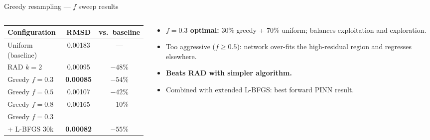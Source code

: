 \documentclass[aspectratio=169, 11pt]{beamer}
\begin{document}
\begin{frame}{Greedy resampling --- $f$ sweep results}
  \begin{columns}[T]
    \begin{column}{0.50\textwidth}
      \centering\footnotesize
      \begin{tabular}{@{}lcc@{}}
        \toprule
        \textbf{Configuration} & \textbf{RMSD} & \textbf{vs.\ baseline} \\
        \midrule
        Uniform (baseline)  & 0.00183 & --- \\
        RAD $k\!=\!2$       & 0.00095 & $-48\%$ \\
        \midrule
        Greedy $f\!=\!0.3$  & \textbf{0.00085} & \textbf{$-54\%$} \\
        Greedy $f\!=\!0.5$  & 0.00107 & $-42\%$ \\
        Greedy $f\!=\!0.8$  & 0.00165 & $-10\%$ \\
        \rowcolor{green!10}
        Greedy $f\!=\!0.3$\\
        \;+ L-BFGS 30k      & \textbf{0.00082} & \textbf{$-55\%$} \\
        \bottomrule
      \end{tabular}
    \end{column}
    \begin{column}{0.48\textwidth}
      \begin{itemize}\small
        \item \textbf{$f\!=\!0.3$ optimal:} 30\% greedy + 70\% uniform;
              balances exploitation and exploration.
        \item Too aggressive ($f\!\ge\!0.5$): network over-fits the
              high-residual region and regresses elsewhere.
        \item \textbf{Beats RAD with simpler algorithm.}
        \item Combined with extended L-BFGS: best forward PINN result.
      \end{itemize}
      \medskip
      \begin{center}\small
      \end{center}
    \end{column}
  \end{columns}
\end{frame}
\end{document}
